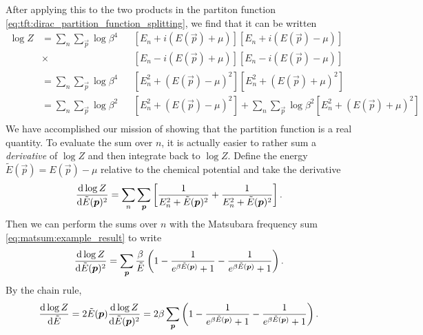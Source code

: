 After applying this to the two products in the partiton function \eqref{eq:tft:dirac_partition_function_splitting}, we find that it can be written
\begin{equation}
\begin{aligned}
	\log Z & = \sum_n \sum_\vec{p} \log \beta^4   && \left[ E_n + i (E(\vec{p}) + \mu) \right] \left[ E_n + i (E(\vec{p}) - \mu) \right] \\
		   & \times \phantom{\sum_n \sum_\vec{p}} && \left[ E_n - i (E(\vec{p}) + \mu) \right] \left[ E_n - i (E(\vec{p}) - \mu) \right] \\
	       & = \sum_n \sum_\vec{p} \log \beta^4   && \left[ E_n^2 + (E(\vec{p}) - \mu)^2 \right] \left[ E_n^2 + (E(\vec{p}) + \mu)^2 \right] \\
	       & = \sum_n \sum_\vec{p} \log \beta^2   && \left[ E_n^2 + (E(\vec{p}) - \mu)^2 \right] + \sum_n \sum_\vec{p} \log \beta^2 \left[ E_n^2 + (E(\vec{p}) + \mu)^2 \right] \\
\end{aligned}
\end{equation}
We have accomplished our mission of showing that the partition function is a real quantity.
To evaluate the sum over $n$, it is actually easier to rather sum a \emph{derivative} of $\log Z$ and then integrate back to $\log Z$.
Define the energy $\tilde E(\vec{p}) = E(\vec{p}) - \mu$ relative to the chemical potential and take the derivative
\begin{equation}
	\odv{\log Z}{\tilde E(\vec{p})^2} = \sum_n \sum_\vec{p} \left[ \frac{1}{E_n^2 + \tilde E(\vec{p})^2} +
	                                                               \frac{1}{E_n^2 + \tilde E(\vec{p})^2} \right] .
\label{eq:tft:matsubara_sum_fermions}
\end{equation}
Then we can perform the sums over $n$ with the Matsubara frequency sum \eqref{eq:matsum:example_result} to write
\begin{equation}
	\odv{\log Z}{\tilde E(\vec{p})^2} = \sum_\vec{p} \frac{\beta}{\tilde E} \left( 1 - \frac{1}{e^{\beta \tilde E(\vec{p})} + 1}
	                                                                                 - \frac{1}{e^{\beta \tilde E(\vec{p})} + 1} \right) .
\end{equation}
By the chain rule,
\begin{equation}
	\odv{\log Z}{\tilde E} = 2 \tilde E(\vec{p}) \odv{\log Z}{\tilde E(\vec{p})^2}
	                       = 2 \beta \sum_\vec{p} \left( 1 - \frac{1}{e^{\beta \tilde E(\vec{p})} + 1}
	                                                       - \frac{1}{e^{\beta \tilde E(\vec{p})} + 1} \right) .
\end{equation}
